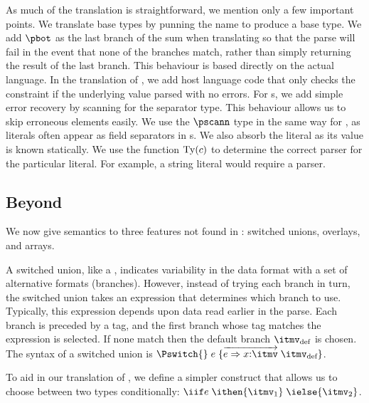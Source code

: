 As much of the translation is straightforward, we mention only a few
important points. We translate base types by punning the \ipads{} name
to produce a \ddc base type. We add $\pbot$ as the last branch of the
\ddc{} sum when translating \Punion{} so that the parse will fail in
the event that none of the branches match, rather than simply
returning the result of the last branch. This behaviour is based
directly on the actual \pads{} language. In the translation of
\Pwhere{}, we add host language code that only checks the constraint
if the underlying value parsed with no errors. For \Parray{}s, we add
simple error recovery by scanning for the separator type.  This
behaviour allows us to skip erroneous elements easily. We use the
$\pscann$ type in the same way for , as literals often
appear as field separators in \Pstruct{}s.  We also absorb the literal
as its value is known statically.  We use the function ${\rm Ty}(c)$
to determine the correct parser for the particular literal. For
example, a string literal would require a \Pstring{} parser.

\subsection{Beyond \ipads{}}

We now give semantics to three features not found in \ipads{}:
\pads{} switched unions, \packettypes{} overlays, and \datascript{} arrays.

A switched union, like a \Punion, indicates variability in the data
format with a set of alternative formats (branches). However, instead
of trying each branch in turn, the switched union takes an expression that
determines which branch to use. Typically, this expression depends upon data read earlier in the parse. Each branch is preceded by a tag,
and the first branch whose tag matches the expression is selected.
If none match then the default branch $\itmv_{\text{def}}$ is chosen.
The syntax of a switched union is $\Pswitch{}\;e\;\{\overrightarrow{e
  \Rightarrow x{:}\itmv}\; \itmv_{\text{def}}\}$.

To aid in our translation of \Pswitch{}, we define a simpler
construct that allows us to choose between two types conditionally:
$\iif e\; \ithen {\itmv_1}\; \ielse {\itmv_2}$. 

